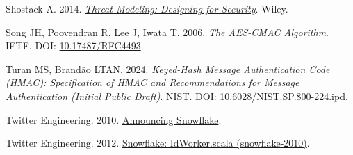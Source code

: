 \documentclass[fleqn,10pt]{wlpeerj}
\newlength{\cslhangindent}
\newenvironment{CSLReferences}[2]
 {\begin{list}{}{%
  \setlength{\itemindent}{0pt}
  \setlength{\leftmargin}{0pt}
  \setlength{\parsep}{0pt}
  \ifodd #1
   \setlength{\leftmargin}{\cslhangindent}
   \setlength{\itemindent}{-1\cslhangindent}
  \fi
  \setlength{\itemsep}{#2\baselineskip}}}
 {\end{list}}
\begin{document}
\begin{CSLReferences}{1}{0}
Shostack A. 2014.
\emph{\href{https://www.wiley.com/en-us/Threat+Modeling\%3A+Designing+for+Security-p-9781118809990}{{Threat
Modeling: Designing for Security}}}. Wiley.

Song JH, Poovendran R, Lee J, Iwata T. 2006. \emph{{The AES-CMAC
Algorithm}}. IETF. DOI:
\href{https://doi.org/10.17487/RFC4493}{10.17487/RFC4493}.

Turan MS, Brandão LTAN. 2024. \emph{{Keyed-Hash Message Authentication
Code (HMAC): Specification of HMAC and Recommendations for Message
Authentication (Initial Public Draft)}}. NIST. DOI:
\href{https://doi.org/10.6028/NIST.SP.800-224.ipd}{10.6028/NIST.SP.800-224.ipd}.

Twitter Engineering. 2010.
\href{https://blog.x.com/engineering/en_us/a/2010/announcing-snowflake}{{Announcing
Snowflake}}.

Twitter Engineering. 2012.
\href{https://github.com/twitter-archive/snowflake/blob/b3f6a3c6ca8e1b6847baa6ff42bf72201e2c2231/src/main/scala/com/twitter/service/snowflake/IdWorker.scala}{{Snowflake:
IdWorker.scala (snowflake-2010)}}.

\end{CSLReferences}
\end{document}
